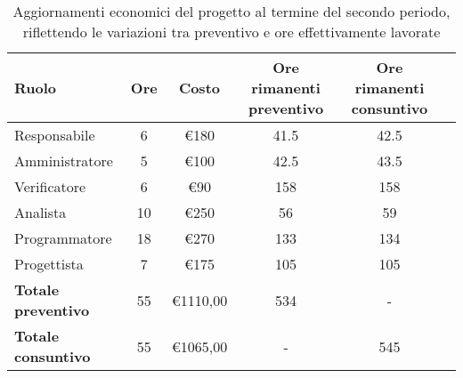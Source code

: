     \begin{table}[!h]
        \centering
        \begin{tabular}{|l| c| c| c| c| c| } 
            \hline
            \textbf{Ruolo} & \textbf{Ore} & \textbf{Costo} & \textbf{Ore rimanenti preventivo} & \textbf{Ore rimanenti consuntivo} \\
            \hline  
             Responsabile        & 6  & €180 & 41.5 & 42.5 \\ 
             Amministratore      & 5  & €100 & 42.5 & 43.5 \\ 
             Verificatore        & 6  & €90  & 158  & 158 \\ 
             Analista            & 10 & €250 & 56   & 59 \\ 
             Programmatore       & 18 & €270 & 133  & 134 \\
             Progettista         & 7  & €175 & 105  & 105 \\
            \hline
            \textbf{Totale preventivo} & 55 & €1110,00 & 534 & - \\
            \hline
            \textbf{Totale consuntivo} & 55 & €1065,00 & - & 545 \\
            \hline
        \end{tabular}
        \caption{Aggiornamenti economici del progetto al termine del secondo periodo, riflettendo le variazioni tra preventivo e ore effettivamente lavorate}
        \label{tab:7}
    \end{table}



